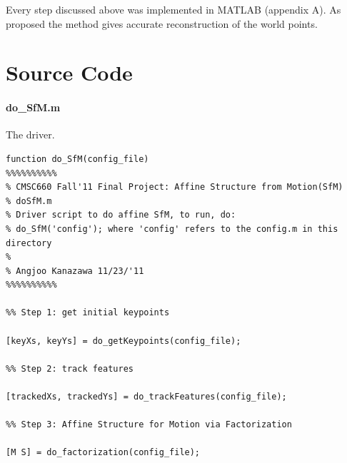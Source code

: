 Every step discussed above was implemented in MATLAB (appendix A). As
proposed the method gives accurate reconstruction of the world
points. 

\appendix
\small
\section{Source Code}
\label{source}
\paragraph{do\_SfM.m}
The driver.
\begin{verbatim}
function do_SfM(config_file)
%%%%%%%%%%
% CMSC660 Fall'11 Final Project: Affine Structure from Motion(SfM)
% doSfM.m
% Driver script to do affine SfM, to run, do:
% do_SfM('config'); where 'config' refers to the config.m in this directory
%
% Angjoo Kanazawa 11/23/'11
%%%%%%%%%%

%% Step 1: get initial keypoints

[keyXs, keyYs] = do_getKeypoints(config_file); 

%% Step 2: track features

[trackedXs, trackedYs] = do_trackFeatures(config_file);

%% Step 3: Affine Structure for Motion via Factorization

[M S] = do_factorization(config_file);
\end{verbatim}
